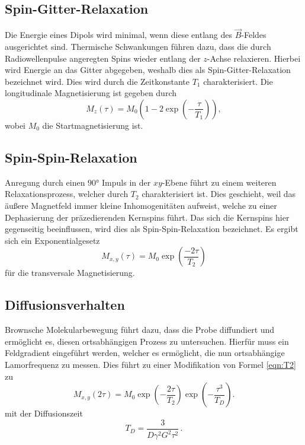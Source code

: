 \subsection{Spin-Gitter-Relaxation}
Die Energie eines Dipols wird minimal, wenn diese entlang des $\vec{B}$-Feldes ausgerichtet sind. Thermische Schwankungen führen dazu, dass die durch Radiowellenpulse angeregten Spins wieder entlang der $z$-Achse relaxieren. Hierbei wird Energie an das Gitter abgegeben, weshalb dies als Spin-Gitter-Relaxation bezeichnet wird. Dies wird durch die Zeitkonstante $T_1$ charakterisiert.
Die longitudinale Magnetisierung ist gegeben durch
\begin{equation}
    M_{z} (\tau) = M_0 \left( 1- 2 \exp(-\frac{\tau}{T_1} ) \right) ,
\end{equation}
wobei $M_0$ die Startmagnetisierung ist.
\subsection{Spin-Spin-Relaxation}
Anregung durch einen $90°$ Impuls in der $xy$-Ebene führt zu einem weiteren Relaxationsprozess, welcher durch $T_2$ charakterisiert ist.
Dies geschieht, weil das äußere Magnetfeld immer kleine Inhomogenitäten aufweist, welche zu einer Dephasierung der präzedierenden Kernspins führt.
Das sich die Kernspins hier gegenseitig beeinflussen, wird dies als Spin-Spin-Relaxation bezeichnet.
Es ergibt sich ein Exponentialgesetz 
\begin{equation}
    \label{eqn:T2}
    M_{x,y}(\tau) = M_0 \exp\left(\frac{-2\tau}{T_2} \right) 
\end{equation}
für die transversale Magnetisierung.
\subsection{Diffusionsverhalten}
Brownsche Molekularbewegung führt dazu, dass die Probe diffundiert und ermöglicht es, diesen ortsabhängigen Prozess zu untersuchen.
Hierfür muss ein Feldgradient eingeführt werden, welcher es ermöglicht, die nun ortsabhängige Lamorfrequenz zu messen. 
Dies führt zu einer Modifikation von Formel \ref{eqn:T2} zu
\begin{equation}
    M_{x,y}(2\tau) = M_0 \exp\left(-\frac{2\tau}{T_2}\right) \exp \left(-\frac{\tau^3}{T_D}\right).
\end{equation}
mit der Diffusionszeit 
\begin{equation}
    T_D = \frac{3}{D \gamma^2 G^2 \tau^2} \, .
    \label{eq:diffusionskonstante}
\end{equation}